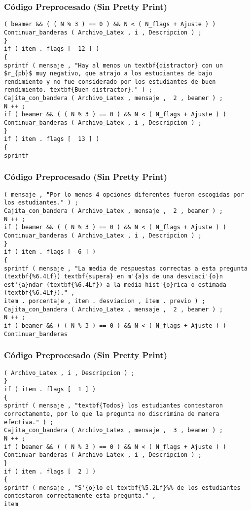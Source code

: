 \documentclass{beamer}
\begin{document}
\begin{frame}[fragile]
\frametitle{C\'odigo Preprocesado (Sin Pretty Print)}
\begin{lstlisting}[style=CStyle]
( beamer && ( ( N % 3 ) == 0 ) && N < ( N_flags + Ajuste ) ) 
Continuar_banderas ( Archivo_Latex , i , Descripcion ) ; 
} 
if ( item . flags [  12 ] ) 
{ 
sprintf ( mensaje , "Hay al menos un textbf{distractor} con un $r_{pb}$ muy negativo, que atrajo a los estudiantes de bajo rendimiento y no fue considerado por los estudiantes de buen rendimiento. textbf{Buen distractor}." ) ; 
Cajita_con_bandera ( Archivo_Latex , mensaje ,  2 , beamer ) ; 
N ++ ; 
if ( beamer && ( ( N % 3 ) == 0 ) && N < ( N_flags + Ajuste ) ) 
Continuar_banderas ( Archivo_Latex , i , Descripcion ) ; 
} 
if ( item . flags [  13 ] ) 
{ 
sprintf \end{lstlisting}
\end{frame}
\begin{frame}[fragile]
\frametitle{C\'odigo Preprocesado (Sin Pretty Print)}
\begin{lstlisting}[style=CStyle]
( mensaje , "Por lo menos 4 opciones diferentes fueron escogidas por los estudiantes." ) ; 
Cajita_con_bandera ( Archivo_Latex , mensaje ,  2 , beamer ) ; 
N ++ ; 
if ( beamer && ( ( N % 3 ) == 0 ) && N < ( N_flags + Ajuste ) ) 
Continuar_banderas ( Archivo_Latex , i , Descripcion ) ; 
} 
if ( item . flags [  6 ] ) 
{ 
sprintf ( mensaje , "La media de respuestas correctas a esta pregunta (textbf{%6.4Lf}) textbf{supera} en m'{a}s de una desviaci'{o}n est'{a}ndar (textbf{%6.4Lf}) a la media hist'{o}rica o estimada (textbf{%6.4Lf})." , 
item . porcentaje , item . desviacion , item . previo ) ; 
Cajita_con_bandera ( Archivo_Latex , mensaje ,  2 , beamer ) ; 
N ++ ; 
if ( beamer && ( ( N % 3 ) == 0 ) && N < ( N_flags + Ajuste ) ) 
Continuar_banderas \end{lstlisting}
\end{frame}
\begin{frame}[fragile]
\frametitle{C\'odigo Preprocesado (Sin Pretty Print)}
\begin{lstlisting}[style=CStyle]
( Archivo_Latex , i , Descripcion ) ; 
} 
if ( item . flags [  1 ] ) 
{ 
sprintf ( mensaje , "textbf{Todos} los estudiantes contestaron correctamente, por lo que la pregunta no discrimina de manera efectiva." ) ; 
Cajita_con_bandera ( Archivo_Latex , mensaje ,  3 , beamer ) ; 
N ++ ; 
if ( beamer && ( ( N % 3 ) == 0 ) && N < ( N_flags + Ajuste ) ) 
Continuar_banderas ( Archivo_Latex , i , Descripcion ) ; 
} 
if ( item . flags [  2 ] ) 
{ 
sprintf ( mensaje , "S'{o}lo el textbf{%5.2Lf}%% de los estudiantes contestaron correctamente esta pregunta." , 
item \end{lstlisting}
\end{frame}
\end{document}

